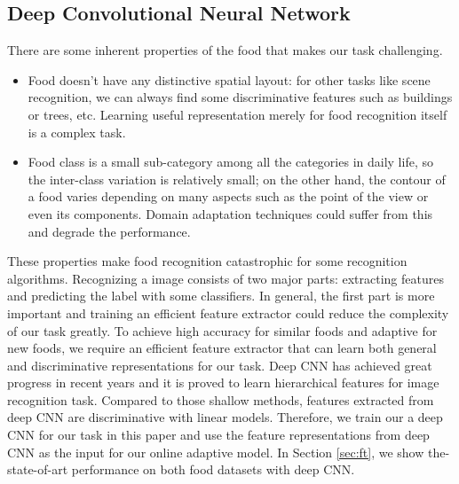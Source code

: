 \subsection{Deep Convolutional Neural Network}
There are some inherent properties of the food that makes our task challenging.
\begin{itemize}
  \item Food doesn't have any distinctive spatial layout: for other tasks like scene recognition, we can always find some discriminative features such as buildings or trees, etc. Learning useful representation merely for food recognition itself is a complex task.
  \item Food class is a small sub-category among all the categories in daily life, so the inter-class variation is relatively small; on the other hand, the contour of a food varies depending on many aspects such as the point of the view or even its components. Domain adaptation techniques could suffer from this and degrade the performance.
\end{itemize}
These properties make food recognition catastrophic for some recognition algorithms. Recognizing a image consists of two major parts: extracting features and predicting the label with some classifiers. In general, the first part is more important and training an efficient feature extractor could reduce the complexity of our task greatly. To achieve high accuracy for similar foods and adaptive for new foods, we require an efficient feature extractor that can learn both general and discriminative representations for our task. Deep CNN has achieved great progress in recent years and it is proved to learn hierarchical features for image recognition task\cite{zeiler2010deconvolutional}. Compared to those shallow methods, features extracted from deep CNN are discriminative with linear models. Therefore, we train our a deep CNN for our task in this paper and use the feature representations from deep CNN as the input for our online adaptive model. In Section \ref{sec:ft}, we show the-state-of-art performance on both food datasets with deep CNN.

